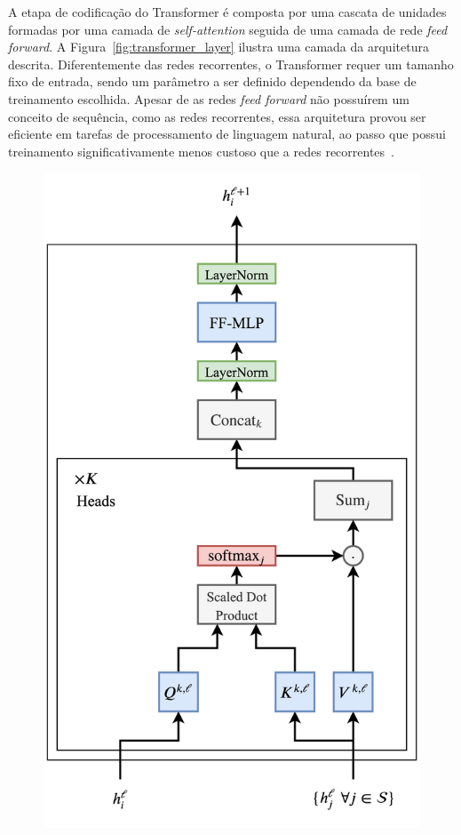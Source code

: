 A etapa de codificação do Transformer é composta por uma cascata de unidades
formadas por uma camada de \textit{self-attention} seguida de uma camada de
rede \textit{feed forward}.
A Figura~\ref{fig:transformer_layer} ilustra uma camada da arquitetura descrita.
Diferentemente das redes recorrentes, o Transformer requer um tamanho fixo de
entrada, sendo um parâmetro a ser definido dependendo da base de treinamento
escolhida.
Apesar de as redes \textit{feed forward} não possuírem um conceito de sequência,
como as redes recorrentes, essa arquitetura provou ser eficiente em tarefas de
processamento de linguagem natural, ao passo que possui treinamento
significativamente menos custoso que a redes recorrentes~\cite{vaswani17}.

\begin{figure}
\begin{center} {
    \begin{center}
    \includegraphics[scale=0.8]{images/transformer_layer.png}

\end{center}}
\end{center}
\end{figure}
